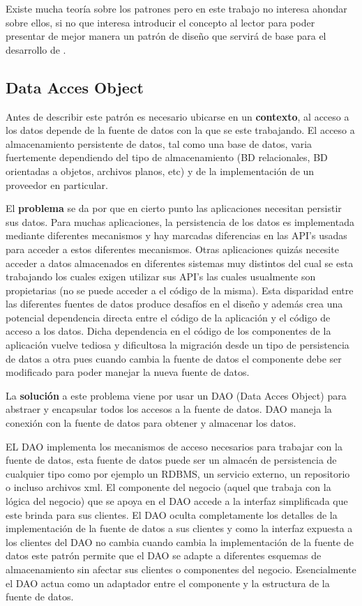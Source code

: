 Existe mucha teoría sobre los patrones pero en este trabajo no interesa ahondar sobre ellos, si no que interesa introducir el concepto al lector para poder presentar de mejor manera un patrón de diseño que servirá de base para el desarrollo de \jj.
%
\subsection{Data Acces Object}\label{jdbgm:dao}
Antes de describir este patrón es necesario ubicarse en un \textbf{contexto}, al acceso a los datos depende de la fuente de datos con la que se este trabajando. El acceso a almacenamiento persistente de datos, tal como una base de datos, varia fuertemente dependiendo del tipo de almacenamiento (BD relacionales, BD orientadas a objetos, archivos planos, etc) y de la implementación de un proveedor en particular.

El \textbf{problema} se da por que en cierto punto las aplicaciones necesitan persistir sus datos. Para muchas aplicaciones, la persistencia de los datos es implementada mediante diferentes mecanismos y hay marcadas diferencias en las API's usadas para acceder a estos diferentes mecanismos. Otras aplicaciones quizás necesite acceder a datos almacenados en diferentes sistemas muy distintos del cual se esta trabajando los cuales exigen utilizar sus API's las cuales usualmente son propietarias (no se puede acceder a el código de la misma). Esta disparidad entre las diferentes fuentes de datos produce desafíos en el diseño y además crea una potencial dependencia directa entre el código de la aplicación y el código de acceso a los datos. Dicha dependencia en el código de los componentes de la aplicación vuelve tediosa y dificultosa la migración desde un tipo de persistencia de datos a otra pues cuando cambia la fuente de datos el componente debe ser modificado para poder manejar la nueva fuente de datos.

La \textbf{solución} a este problema viene por usar un DAO (Data Acces Object) para abstraer y encapsular todos los accesos a la fuente de datos. DAO maneja la conexión con la fuente de datos para obtener y almacenar los datos.

EL DAO implementa los mecanismos de acceso necesarios para trabajar con la fuente de datos, esta fuente de datos puede ser un almacén de persistencia de cualquier tipo como por ejemplo un RDBMS, un servicio externo, un repositorio o incluso archivos xml. El componente del negocio (aquel que trabaja con la lógica del negocio) que se apoya en el DAO accede a la interfaz simplificada que este brinda para sus clientes. El DAO oculta completamente los detalles de la implementación de la fuente de datos a sus clientes y como la interfaz expuesta a los clientes del DAO no cambia cuando cambia la implementación de la fuente de datos este patrón permite que el DAO se adapte a diferentes esquemas de almacenamiento sin afectar sus clientes o componentes del negocio. Esencialmente el DAO actua como un adaptador entre el componente y la estructura de la fuente de datos.


